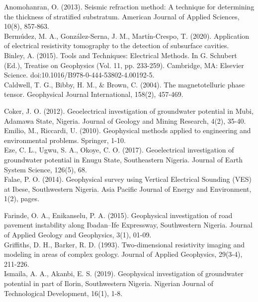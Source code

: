 \documentclass[12pt,a4paper]{report}
\begin{document}
\begin{justify}
    Anomohanran, O. (2013). Seismic refraction method: A technique for determining the thickness of stratified substratum. American Journal of Applied Sciences, 10(8), 857-863. \\
        
    Bermúdez, M. A., González-Serna, J. M., Martín-Crespo, T. (2020). Application of electrical resistivity tomography to the detection of subsurface cavities. \\
    
    Binley, A. (2015). Tools and Techniques: Electrical Methods. In G. Schubert (Ed.), Treatise on Geophysics (Vol. 11, pp. 233-259). Cambridge, MA: Elsevier Science. doi:10.1016/B978-0-444-53802-4.00192-5. \\
    
    Caldwell, T. G., Bibby, H. M., \& Brown, C. (2004). The magnetotelluric phase tensor. Geophysical Journal International, 158(2), 457-469.

    Coker, J. O. (2012). Geoelectrical investigation of groundwater potential in Mubi, Adamawa State, Nigeria. Journal of Geology and Mining Research, 4(2), 35-40. \\
    
    Emilio, M., Riccardi, U. (2010). Geophysical methods applied to engineering and environmental problems. Springer, 1-10. \\
    
    Eze, C. L., Ugwu, S. A., Okoye, C. O. (2017). Geoelectrical investigation of groundwater potential in Enugu State, Southeastern Nigeria. Journal of Earth System Science, 126(5), 68. \\
    
    Falae, P. O. (2014). Geophysical survey using Vertical Electrical Sounding (VES) at Ibese, Southwestern Nigeria. Asia Pacific Journal of Energy and Environment, 1(2), pages.

    Farinde, O. A., Enikanselu, P. A. (2015). Geophysical investigation of road pavement instability along Ibadan–Ife Expressway, Southwestern Nigeria. Journal of Applied Geology and Geophysics, 3(1), 01-09. \\
    
    Griffiths, D. H., Barker, R. D. (1993). Two-dimensional resistivity imaging and modeling in areas of complex geology. Journal of Applied Geophysics, 29(3-4), 211-226. \\
    
    Ismaila, A. A., Akanbi, E. S. (2019). Geophysical investigation of groundwater potential in part of Ilorin, Southwestern Nigeria. Nigerian Journal of Technological Development, 16(1), 1-8. \\
    

\end{justify}
\end{document}
